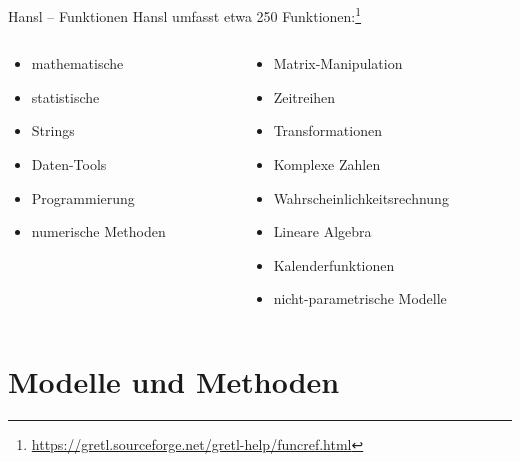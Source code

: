 \documentclass{beamer}[11pt]
\begin{document}
\begin{frame}{Hansl -- Funktionen}
	Hansl umfasst etwa 250 Funktionen:\footnote{\url{https://gretl.sourceforge.net/gretl-help/funcref.html}}
	\begin{columns}[T] %
		\begin{column}{.5\textwidth}
			\begin{itemize}
				\item mathematische
				\item statistische
				\item Strings
				\item Daten-Tools
				\item Programmierung
				\item numerische Methoden
			\end{itemize}
		\end{column}

		\begin{column}{.5\textwidth}
			\begin{itemize}
				\item Matrix-Manipulation
				\item Zeitreihen
				\item Transformationen
				\item Komplexe Zahlen
				\item Wahrscheinlichkeitsrechnung
				\item Lineare Algebra
				\item Kalenderfunktionen
				\item nicht-parametrische Modelle
			\end{itemize}
	  \end{column}
	\end{columns}
\end{frame}

\section{Modelle und Methoden}
\end{document}
